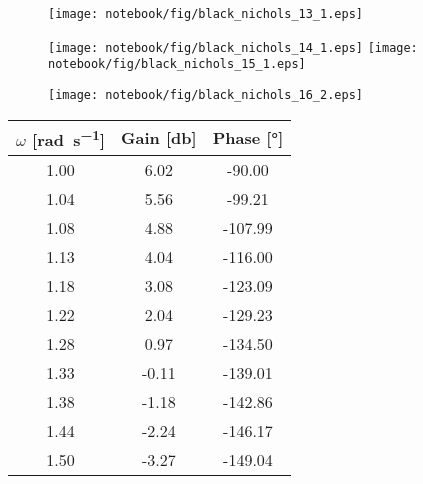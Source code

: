 \begin{figure}[!h]
\begin{center}
    \texttt{[image: notebook/fig/black\_nichols\_13\_1.eps]}
\end{center}
\end{figure}
    
\begin{figure}[!h]
\begin{center}
    \texttt{[image: notebook/fig/black\_nichols\_14\_1.eps]}
    \texttt{[image: notebook/fig/black\_nichols\_15\_1.eps]}
\end{center}
\end{figure}

\begin{figure}[!h]
\begin{center}
    \texttt{[image: notebook/fig/black\_nichols\_16\_2.eps]}
\end{center}
\end{figure}

\begin{center}
\begin{tabular}{ccc}
\hline
$\omega$ [\si{\radian\per\second}] & Gain [\si{\decibel}] & Phase [\si{\degree}]\\
\hline
1.00 & 6.02 & -90.00\\
1.04 & 5.56 & -99.21\\
1.08 & 4.88 & -107.99\\
1.13 & 4.04 & -116.00\\
1.18 & 3.08 & -123.09\\
1.22 & 2.04 & -129.23\\
1.28 & 0.97 & -134.50\\
1.33 & -0.11 & -139.01\\
1.38 & -1.18 & -142.86\\
1.44 & -2.24 & -146.17\\
1.50 & -3.27 & -149.04\\
\hline
\end{tabular}
\end{center}

